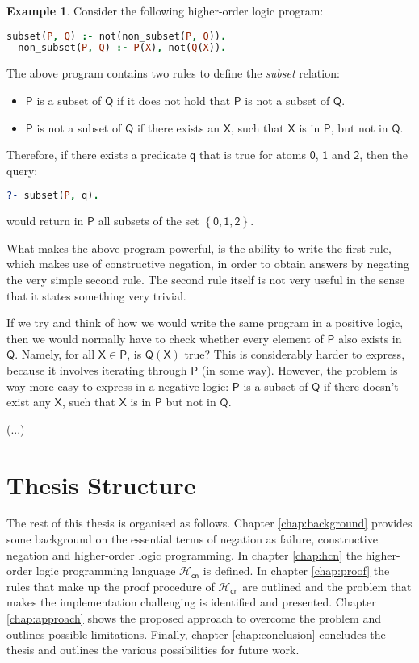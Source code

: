 \documentclass[inscr,ack,preface]{dithesis}
\theoremstyle{definition}
\newtheorem{example}{Example}[chapter]
\newcommand{\hcn}{$\mathcal{H}_\mathsf{cn}$}
\newcommand{\msf}[1]{$\mathsf{#1}$}
\begin{document}
\begin{example}\label{ex:subset}
Consider the following higher-order logic program:
\begin{lstlisting}[language=Prolog,frame=single]
  subset(P, Q) :- not(non_subset(P, Q)).
  non_subset(P, Q) :- P(X), not(Q(X)).
\end{lstlisting}
The above program contains two rules to define the \emph{subset} relation:
\begin{itemize}
  \item \msf{P} is a subset of \msf{Q} if it does not hold that \msf{P} is not a subset of \msf{Q}.
  \item \msf{P} is not a subset of \msf{Q} if there exists an \msf{X}, such that \msf{X} is in \msf{P}, but not in \msf{Q}.
\end{itemize}
Therefore, if there exists a predicate \msf{q} that is true for atoms \msf{0}, \msf{1} and \msf{2}, then the query:
\begin{lstlisting}[language=Prolog,frame=single]
  ?- subset(P, q).
\end{lstlisting}
would return in \msf{P} all subsets of the set \msf{\left\{ 0, 1, 2 \right\}}.

What makes the above program powerful, is the ability to write the first rule, which makes use of constructive negation, in order to obtain answers by negating the very simple second rule. The second rule itself is not very useful in the sense that it states something very trivial.

If we try and think of how we would write the same program in a positive logic, then we would normally have to check whether every element of \msf{P} also exists in \msf{Q}. Namely, for all \msf{X \in P}, is \msf{Q(X)} true? This is considerably harder to express, because it involves iterating through \msf{P} (in some way). However, the problem is way more easy to express in a negative logic: \msf{P} is a subset of \msf{Q} if there doesn't exist any \msf{X}, such that \msf{X} is in \msf{P} but not in \msf{Q}.
\end{example}

(...)

\section{Thesis Structure}
The rest of this thesis is organised as follows. Chapter \ref{chap:background} provides some background on the essential terms of negation as failure, constructive negation and higher-order logic programming. In chapter \ref{chap:hcn} the higher-order logic programming language \hcn{} is defined. In chapter \ref{chap:proof} the rules that make up the proof procedure of \hcn{} are outlined and the problem that makes the implementation challenging is identified and presented. Chapter \ref{chap:approach} shows the proposed approach to overcome the problem and outlines possible limitations. Finally, chapter \ref{chap:conclusion} concludes the thesis and outlines the various possibilities for future work.
\end{document}
